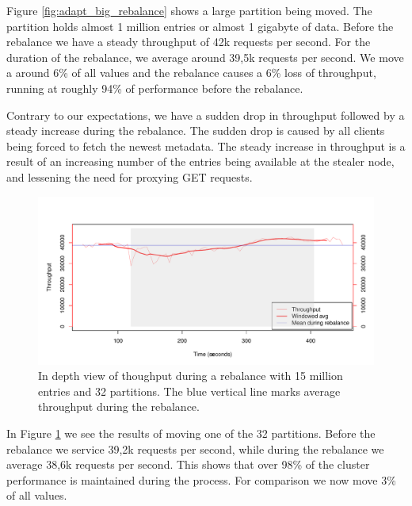 Figure \ref{fig:adapt_big_rebalance} shows a large partition being moved. The partition holds almost 1 million entries or almost 1 gigabyte of data. Before the rebalance we have a steady throughput of 42k requests per second. For the duration of the rebalance, we average around 39,5k requests per second. We move a around 6\% of all values and the rebalance causes a 6\% loss of throughput, running at roughly 94\% of performance before the rebalance. 

Contrary to our expectations, we have a sudden drop in throughput followed by a steady increase during the rebalance. The sudden drop is caused by all clients being forced to fetch the newest metadata. The steady increase in throughput is a result of an increasing number of the entries being available at the stealer node, and lessening the need for proxying GET requests.

\clearpage
\begin{figure}[h]
    \centering
    \includegraphics[width = 1.0\textwidth]{results/throughput/adaptive/zookeeper/auto_3nodes_32part.pdf}
    \caption{In depth view of thoughput during a rebalance with 15 million entries and 32 partitions. The blue vertical line marks average throughput during the rebalance.}
    \label{fig:adapt_small_rebalance}
\end{figure}

In Figure \ref{fig:adapt_small_rebalance} we see the results of moving one of the 32 partitions. Before the rebalance we service 39,2k requests per second, while during the rebalance we average 38,6k requests per second. This shows that over 98\% of the cluster performance is maintained during the process. For comparison we now move 3\% of all values.


